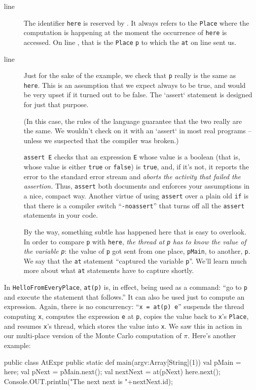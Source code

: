 \begin{description}
\item[line ] The identifier {\tt here} is reserved by \Xten.
It always refers to the {\tt Place} where the computation is happening at
the moment the occurrence of {\tt here} is accessed. On line ,
that is the
{\tt Place} {\tt p} to which the {\tt at} on line   sent us.  

\item[line ] Just for the sake of the example,
we check that {\tt p} really is the same as {\tt here}.  
This is an assumption that we expect always to be true, and would be very
upset if it turned out to be false.  The \xcd`assert` statement is designed
for just that purpose.  

(In this case, the rules of the language guarantee that the two really are the
same.  We wouldn't check on it with an \xcd`assert` in most real programs --
unless we suspected that the compiler was broken.)


   {\tt assert E} checks that an expression {\tt E} whose value is a 
   boolean (that is, whose value is either {\tt true} or {\tt false}) is {\tt true}, and, if it's not,
   it reports the error to the standard error stream and {\em aborts the activity
   that failed the assertion.}   Thus, {\tt assert} both documents and enforces
   your assumptions in a nice, compact way.
   Another virtue of using {\tt assert} over a plain
   old {\tt if} is that there is a compiler switch ``{\tt -noassert}'' that turns off all
   the {\tt assert} statements in your code.  


By the way, something subtle has happened here that is easy to overlook.
In order to compare {\tt p} with {\tt here}, {\em the thread at {\tt p} has to know
the value of the variable {\tt p}}: the value of {\tt p} got
sent from one place, {\tt pMain}, to another, {\tt p}.  We say that
the {\tt at} statement ``captured the variable {\tt p}''.  
We'll learn much more about what {\tt at} statements have to capture shortly.       
\end{description}

In {\tt HelloFromEveryPlace}, {\tt at(p)} is, in effect, being used as a command: 
``go to {\tt p} and execute the statement that follows.''   It can also be used just to 
compute an expression.  Again, there is no concurrency: ``{\tt x = at(p) e}'' suspends
the thread computing {\tt x}, computes the expression {\tt e} at {\tt p}, copies the
value back to {\tt x}'s {\tt Place}, and resumes {\tt x}'s thread, which
stores the value into {\tt x}.  We saw this in action in our multi-place version
of the Monte Carlo computation of $\pi$.  Here's another example:
\begin{xtennum}[]
public class AtExpr {
   public static def main(argv:Array[String](1)) {
      val pMain = here;                      
      val pNext = pMain.next();              
      val nextNext = at(pNext) here.next();  
      Console.OUT.println("The next next is "+nextNext.id);     
   }
}
\end{xtennum}

